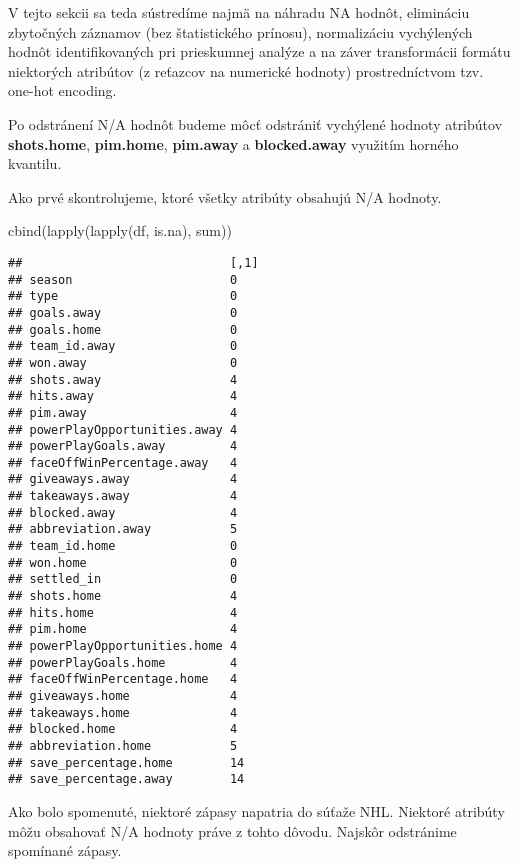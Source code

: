 \documentclass[
]{article}
\newenvironment{Shaded}{\begin{snugshade}}{\end{snugshade}}
\newcommand{\FunctionTok}[1]{\textcolor[rgb]{0.00,0.00,0.00}{#1}}
\newcommand{\NormalTok}[1]{#1}
\newcommand{\SpecialCharTok}[1]{\textcolor[rgb]{0.00,0.00,0.00}{#1}}
\begin{document}
V tejto sekcii sa teda sústredíme najmä na náhradu NA hodnôt, elimináciu
zbytočných záznamov (bez štatistického prínosu), normalizáciu
vychýlených hodnôt identifikovaných pri prieskumnej analýze a na záver
transformácii formátu niektorých atribútov (z reťazcov na numerické
hodnoty) prostredníctvom tzv. one-hot encoding.

Po odstránení N/A hodnôt budeme môcť odstrániť vychýlené hodnoty
atribútov \textbf{shots.home}, \textbf{pim.home}, \textbf{pim.away} a
\textbf{blocked.away} využitím horného kvantilu.

Ako prvé skontrolujeme, ktoré všetky atribúty obsahujú N/A hodnoty.

\begin{Shaded}
\begin{Highlighting}[]
\FunctionTok{cbind}\NormalTok{(}\FunctionTok{lapply}\NormalTok{(}\FunctionTok{lapply}\NormalTok{(df, is.na), sum))}
\end{Highlighting}
\end{Shaded}

\begin{verbatim}
##                             [,1]
## season                      0   
## type                        0   
## goals.away                  0   
## goals.home                  0   
## team_id.away                0   
## won.away                    0   
## shots.away                  4   
## hits.away                   4   
## pim.away                    4   
## powerPlayOpportunities.away 4   
## powerPlayGoals.away         4   
## faceOffWinPercentage.away   4   
## giveaways.away              4   
## takeaways.away              4   
## blocked.away                4   
## abbreviation.away           5   
## team_id.home                0   
## won.home                    0   
## settled_in                  0   
## shots.home                  4   
## hits.home                   4   
## pim.home                    4   
## powerPlayOpportunities.home 4   
## powerPlayGoals.home         4   
## faceOffWinPercentage.home   4   
## giveaways.home              4   
## takeaways.home              4   
## blocked.home                4   
## abbreviation.home           5   
## save_percentage.home        14  
## save_percentage.away        14
\end{verbatim}

Ako bolo spomenuté, niektoré zápasy napatria do súťaže NHL. Niektoré
atribúty môžu obsahovať N/A hodnoty práve z tohto dôvodu. Najskôr
odstránime spomínané zápasy.

\begin{Shaded}
\end{Shaded}
\end{document}
